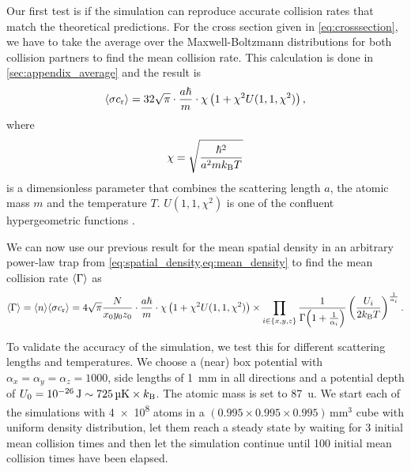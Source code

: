 Our first test is if the simulation can reproduce accurate collision rates that match the theoretical predictions. For the cross section given in \cref{eq:crosssection}, we have to take the average \meanProb over the Maxwell-Boltzmann distributions for both collision partners to find the mean collision rate. This calculation is done in \cref{sec:appendix_average} and the result is
\begin{equation*}
    \langle\sigma c_\text{r}\rangle = 32\sqrt{\pi} \cdot \frac{a\hbar}{m} \cdot \chi \left(1 + \chi^2U(1,1,\chi^2)\right),
\end{equation*}
where
\begin{equation*}
    \chi = \sqrt{\frac{\hbar^2}{a^2 m k_\text{B} T}}
\end{equation*}
is a dimensionless parameter that combines the scattering length $a$, the atomic mass $m$ and the temperature $T$. $U(1,1,\chi^2)$ is one of the confluent hypergeometric functions \cite[Eq.~13.2.6]{NIST:DLMF}.

We can now use our previous result for the mean spatial density in an arbitrary power-law trap from \cref{eq:spatial_density,eq:mean_density} to find the mean collision rate $\langle\Gamma\rangle$ as
\begin{equation}\label{eq:meancollisionrate}
    \langle\Gamma\rangle = \langle n\rangle \langle\sigma c_\text{r}\rangle = 4\sqrt{\pi} \frac{N}{x_0y_0z_0} \cdot \frac{a\hbar}{m} \cdot \chi \left(1 + \chi^2U(1,1,\chi^2)\right) \times \prod_{i\in\{x,y,z\}}\frac{1}{\Gamma\!\left(1 + \frac{1}{\alpha_i}\right)}\left(\frac{U_i}{2 k_\text{B} T}\right)^{\frac{1}{\alpha_i}}. 
\end{equation}

To validate the accuracy of the simulation, we test this for different scattering lengths and temperatures. We choose a (near) box potential with $\alpha_x = \alpha_y = \alpha_z = 1000$, side lengths of \SI{1}{mm} in all directions and a potential depth of $U_0 = \SI{e-26}{J} \sim \SI{725}{\micro\kelvin}\times k_\text{B}$. The atomic mass is set to \SI{87}{u}. We start each of the simulations with \num{4e8} atoms in a $(\num{0.995} \times \num{0.995} \times \num{0.995})\, \si{\milli\meter\cubed}$ cube with uniform density distribution, let them reach a steady state by waiting for 3 initial mean collision times and then let the simulation continue until 100 initial mean collision times have been elapsed.

